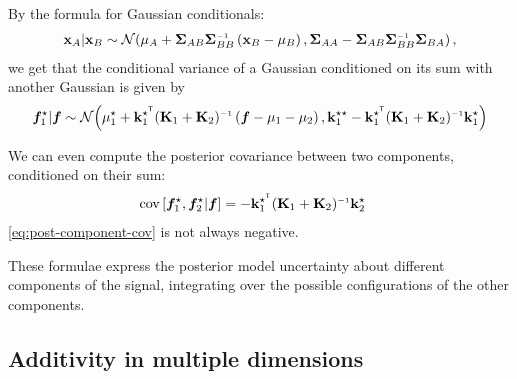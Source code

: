 By the formula for Gaussian conditionals:
\begin{align}
\vx_A | \vx_B \sim \Nt{\vmu_A + \vSigma_{AB} \vSigma_{BB}\inv \left( \vx_B - \vmu_B \right) }
{\vSigma_{AA} - \vSigma_{AB} \vSigma_{BB}\inv \vSigma_{BA} },
\end{align}
we get that the conditional variance of a Gaussian conditioned on its sum with another Gaussian is given by
\begin{align}
\vf_1^\star | \vf \sim \Nt{\vmu_1^\star + \vk_1^{\star\tra} (\vK_1 + \vK_2)\inv \left( \vf - \vmu_1 - \vmu_2 \right) } { \vk_1^{\star\star} - \vk_1^{\star\tra} (\vK_1 + \vK_2)\inv \vk_1^{\star}}
\end{align}

We can even compute the posterior covariance between two components, conditioned on their sum:
%
\begin{align}
\covargs{ \vf_1^\star}{\vf_2^\star | \vf } 
& = - \vk_1^{\star\tra} (\vK_1 + \vK_2)\inv \vk_2^\star
\label{eq:post-component-cov}
\end{align}
%
\ref{eq:post-component-cov} is not always negative.

These formulae express the posterior model uncertainty about different components of the signal, integrating over the possible configurations of the other components.






\subsection{Additivity in multiple dimensions}
  

